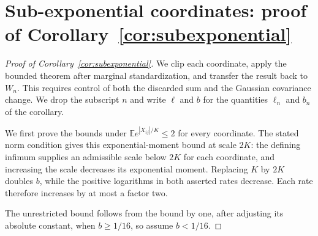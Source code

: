 \documentclass[11pt,letterpaper]{article}
\newif\ifshowtrim
\newcommand{\trim}[1]{\ifshowtrim{\color{revblue}%
\hypersetup{linkcolor=revblue,citecolor=revblue,urlcolor=revblue}#1}\else#1\fi}
\newcommand{\trs}[1]{\ifshowtrim{\color{revblue}#1}\else#1\fi}
\theoremstyle{remark}
\newcommand{\E}{\mathbb E}
\begin{document}
\section{\texorpdfstring{\trs{Sub-exponential coordinates: proof of Corollary~\ref{cor:subexponential}}}{Sub-exponential coordinates: proof of Corollary 2}}\label{app:subexponential}
\begin{proof}[Proof of Corollary~\ref{cor:subexponential}]
We clip each coordinate, apply the bounded theorem after marginal
standardization, and transfer the result back to \(W_n\). This requires
control of both the discarded sum and the Gaussian covariance change.
\trim{We drop the subscript \(n\) and write \(\ell\) and \(b\) for the
quantities \(\ell_n\) and \(b_n\) of the corollary.}

We first prove the bounds under \(\E e^{|X_{ij}|/K}\le2\) for every
coordinate. The stated norm condition gives this exponential-moment
bound at scale \(2K\): the defining infimum supplies an admissible
scale below \(2K\) for each coordinate, and increasing the scale
decreases its exponential moment. Replacing \(K\) by \(2K\) doubles
\(b\), while the positive logarithms in both asserted rates decrease.
Each rate therefore increases by at most a factor two.

The unrestricted bound follows from the bound by one, after adjusting its absolute
constant, when \(b\ge1/16\), so assume \(b<1/16\).


\end{proof}
\end{document}
